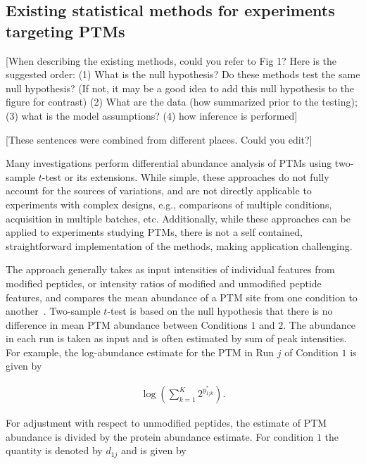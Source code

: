 \documentclass[mcp]{article}
\numberwithin{table}{section}
\def\todo#1{{\color{red}[#1]}}
\begin{document}
\subsection*{Existing statistical methods for experiments targeting PTMs}

 \todo{When describing the existing methods, could you refer to Fig 1? Here is the suggested order: (1) What is the null hypothesis? Do these methods test the same null hypothesis? (If not, it may be a good idea to add this null hypothesis to the figure for contrast) (2) What are the data (how summarized prior to the testing); (3) what is the model assumptions? (4) how inference is performed} 

\todo{These sentences were combined from different places. Could you edit?} 

Many investigations perform differential abundance analysis of PTMs using two-sample $t$-test or its extensions. While simple, these approaches do not fully account for the sources of variations, and are not directly applicable to experiments with complex designs, e.g., comparisons of multiple conditions, acquisition in multiple batches, etc. Additionally, while these approaches can be applied to experiments studying PTMs, there is not a self contained, straightforward implementation of the methods, making application challenging. 

The approach generally takes as input intensities of individual features from modified peptides, or intensity ratios of modified and unmodified peptide features, and compares the mean abundance of a PTM site from one condition to another~\cite{Schwammle2015}\cite{THOMAS2020}. Two-sample $t$-test is based on the null hypothesis that there is no difference in mean PTM abundance between Conditions $1$ and $2$. The abundance in each run is taken as input and is often estimated by sum of peak intensities. For example, the log-abundance estimate for the PTM in Run $j$ of Condition $1$ is given by

\begin{equation}
\begin{aligned}
\log \left( \sum_{k=1}^{K} 2^{y_{1jk}^{\ast}} \right).
\end{aligned}
\label{eq:feature_estimation}
\end{equation}

For adjustment with respect to unmodified peptides, the estimate of PTM abundance is divided by the protein abundance estimate.
For condition $1$ the quantity is denoted by $d_{1j}$ and is given by
\end{document}

